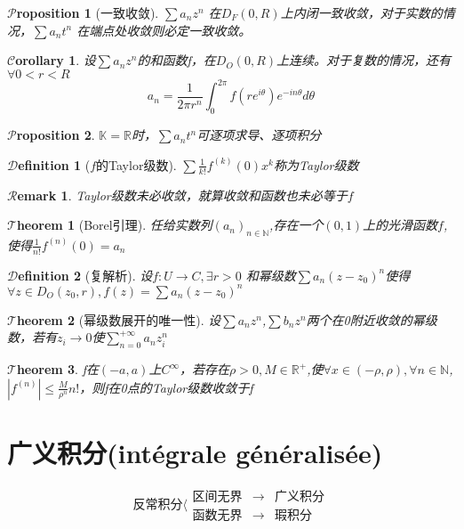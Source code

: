 \documentclass[hyperfer,UTF8,a4paper,12pt]{article}
\theoremstyle{plain}
\newtheorem{Thm}{$\mathcal{T}$heorem}
\newtheorem*{Cor}{$\mathcal{C}$orollary}
\newtheorem*{Prop}{$\mathcal{P}$roposition}
\newtheorem*{Remark}{$\mathcal{R}$emark}
\newtheorem{Def}{{$\mathcal{D}$efinition}}[section]
\begin{document}
\begin{Prop}[一致收敛]
	$ \sum a_nz^n $ 在$ D_F(0,R) $上内闭一致收敛，对于实数的情况，$ \sum a_nt^n $ 在端点处收敛则必定一致收敛。
\end{Prop}
\begin{Cor}
	设$ \sum a_nz^n $的和函数f，在$ D_O(0,R) $上连续。对于复数的情况，还有$\forall 0<r<R$
	\[a_n=\frac{1}{2\pi r^n}\int_{0}^{2\pi}f(re^{i\theta})e^{-in\theta} d\theta \]
\end{Cor}

\begin{Prop}
	$\mathbb{K}=\mathbb{R} $时，$ \sum a_nt^n $可逐项求导、逐项积分
\end{Prop}

\begin{Def}[$ f $的Taylor级数]
	$ \sum \frac{1}{k!}f^{(k)}(0)x^k $称为Taylor级数
\end{Def}
\begin{Remark}
	Taylor级数未必收敛，就算收敛和函数也未必等于$ f $
\end{Remark}

\begin{Thm}[Borel引理]
	任给实数列$ (a_n)_{n\in\mathbb{N}}$,存在一个$ (0,1) $上的光滑函数$ f $,使得$ \frac{1}{n!}f^{(n)}(0)=a_n $
\end{Thm}

\begin{Def}[复解析]
	设$ f:U\to C,\exists r>0$ 和幂级数$ \sum a_n(z-z_0)^n $使得$ \forall z\in D_O(z_0,r),f(z)=\sum\limits a_n(z-z_0)^n $
\end{Def}

\begin{Thm}[幂级数展开的唯一性]
	设$ \sum a_nz^n $,$ \sum b_nz^n $两个在0附近收敛的幂级数，若有$ z_i\to 0 $使$ \sum\limits_{n=0}^{+\infty}a_nz_i^n $
\end{Thm}


\begin{Thm}
	f在$ (-a,a) $上$ C^\infty $，若存在$ \rho >0 ,M\in\mathbb{R}^+$,使$ \forall x\in(-\rho,\rho),\forall n\in\mathbb{N} $,$|f^{(n)}|\leqslant \frac{M}{\rho^n}n!$，则f在0点的Taylor级数收敛于f
\end{Thm}

\section{广义积分(intégrale généralisée)}
\[ \textrm{反常积分}\langle\begin{array}{ccc}\textrm{区间无界}&\to&\textrm{广义积分}\\
\textrm{函数无界}&\to&\textrm{瑕积分}\end{array} \]
\end{document}
